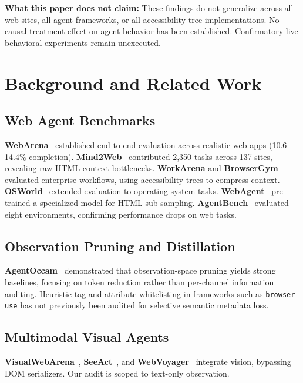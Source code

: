 \documentclass[conference]{IEEEtran}
\begin{document}
\textbf{What this paper does not claim:} These findings do not generalize across all web sites, all agent frameworks, or all accessibility tree implementations. No causal treatment effect on agent behavior has been established. Confirmatory live behavioral experiments remain unexecuted.

\section{Background and Related Work}
\label{sec:related}

\subsection{Web Agent Benchmarks}
\textbf{WebArena}~\cite{zhou2024webarena} established end-to-end evaluation across realistic web apps (10.6--14.4\% completion). \textbf{Mind2Web}~\cite{deng2023mind2web} contributed 2,350 tasks across 137 sites, revealing raw HTML context bottlenecks. \textbf{WorkArena} and \textbf{BrowserGym}~\cite{drouin2024workarena, workarenapp2024} evaluated enterprise workflows, using accessibility trees to compress context. \textbf{OSWorld}~\cite{osworld2024} extended evaluation to operating-system tasks. \textbf{WebAgent}~\cite{gur2024webagent} pre-trained a specialized model for HTML sub-sampling. \textbf{AgentBench}~\cite{liu2024agentbench} evaluated eight environments, confirming performance drops on web tasks.

\subsection{Observation Pruning and Distillation}
\textbf{AgentOccam}~\cite{agentoccam2025} demonstrated that observation-space pruning yields strong baselines, focusing on token reduction rather than per-channel information auditing. Heuristic tag and attribute whitelisting in frameworks such as \texttt{browser-use} has not previously been audited for selective semantic metadata loss.

\subsection{Multimodal Visual Agents}
\textbf{VisualWebArena}~\cite{koh2024visualwebarena}, \textbf{SeeAct}~\cite{zheng2024seeact}, and \textbf{WebVoyager}~\cite{he2024webvoyager} integrate vision, bypassing DOM serializers. Our audit is scoped to text-only observation.
\end{document}
